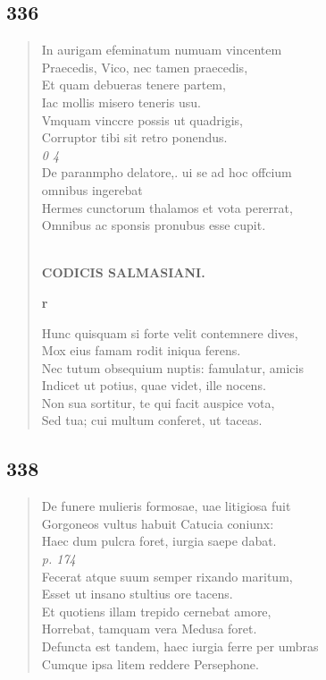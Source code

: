 \documentclass[11pt, a4paper]{report}
\begin{document}
            \subsection*{336}
      \begin{verse}
      In aurigam efeminatum numuam vincentem \\ Praecedis, Vico, nec tamen praecedis, \\ Et quam debueras tenere partem, \\ Iac mollis misero teneris usu. \\ Vmquam vinccre possis ut quadrigis, \\ Corruptor tibi sit retro ponendus. \\ \textit{0 4} \\ De paranmpho delatore,. ui se ad hoc offcium \\ omnibus ingerebat \\ Hermes cunctorum thalamos et vota pererrat, \\ Omnibus ac sponsis pronubus esse cupit. \\ 
        ﻿\pagebreak 
    \begin{center} \textbf{CODICIS SALMASIANI.} \end{center}\begin{center} \textbf{r} \end{center}Hunc quisquam  \lbrack si \rbrack  forte velit contemnere dives, \\ Mox eius famam rodit iniqua ferens. \\ Nec tutum obsequium nuptis: famulatur, amicis \\ Indicet ut potius, quae videt, ille nocens. \\ Non sua sortitur, te qui facit auspice vota, \\ Sed tua; cui multum conferet, ut taceas. \\ 
      \end{verse}
  
            \subsection*{338}
      \begin{verse}
      De funere mulieris formosae, uae litigiosa fuit \\ Gorgoneos vultus habuit Catucia coniunx: \\ Haec dum pulcra foret, iurgia saepe dabat. \\ \textit{p. 174} \\ Fecerat atque  \lbrack suum \rbrack  semper rixando maritum, \\ Esset ut insano stultius ore tacens. \\ Et quotiens illam trepido cernebat amore, \\ Horrebat, tamquam vera Medusa foret. \\ Defuncta est tandem, haec iurgia ferre per umbras \\ Cumque ipsa litem reddere Persephone. \\ 
      \end{verse}
  
\end{document}
